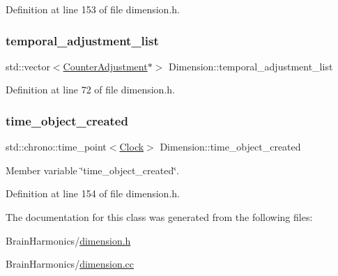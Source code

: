 Definition at line 153 of file dimension.\+h.

\mbox{\label{class_dimension_a370bb42cca1211c7a6c66846ecec4dd9}} 
\subsubsection{\texorpdfstring{temporal\+\_\+adjustment\+\_\+list}{temporal\_adjustment\_list}}
{\footnotesize\ttfamily std\+::vector$<$\hyperlink{struct_dimension_1_1_counter_adjustment}{Counter\+Adjustment}$\ast$$>$ Dimension\+::temporal\+\_\+adjustment\+\_\+list}



Definition at line 72 of file dimension.\+h.

\mbox{\label{class_dimension_a99ba1a7fe44c7e52520144ab4793cad3}} 
\subsubsection{\texorpdfstring{time\+\_\+object\+\_\+created}{time\_object\_created}}
{\footnotesize\ttfamily std\+::chrono\+::time\+\_\+point$<$\hyperlink{universe_8h_a0ef8d951d1ca5ab3cfaf7ab4c7a6fd80}{Clock}$>$ Dimension\+::time\+\_\+object\+\_\+created\hspace{0.3cm}{\ttfamily [protected]}}



Member variable \char`\"{}time\+\_\+object\+\_\+created\char`\"{}. 



Definition at line 154 of file dimension.\+h.



The documentation for this class was generated from the following files\+:\begin{DoxyCompactItemize}
\item 
Brain\+Harmonics/\hyperlink{dimension_8h}{dimension.\+h}\item 
Brain\+Harmonics/\hyperlink{dimension_8cc}{dimension.\+cc}\end{DoxyCompactItemize}
